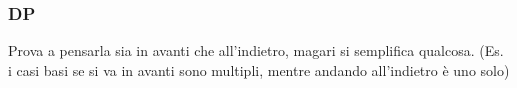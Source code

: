 \subsubsection{DP} Prova a pensarla sia in avanti che all'indietro, magari si semplifica qualcosa. (Es. i casi basi se si va in avanti sono multipli, mentre andando all'indietro è uno solo)
